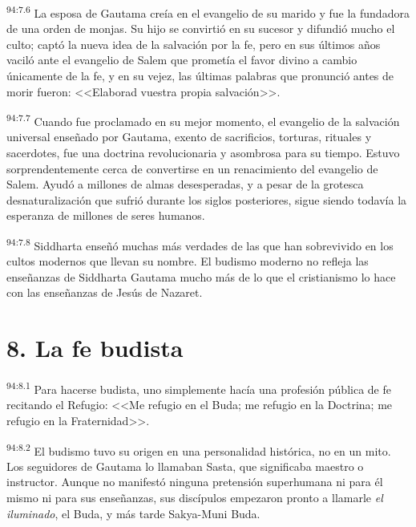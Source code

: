 \par
\textsuperscript{94:7.6} La esposa de Gautama creía en el evangelio de su marido y fue la fundadora de una orden de monjas. Su hijo se convirtió en su sucesor y difundió mucho el culto; captó la nueva idea de la salvación por la fe, pero en sus últimos años vaciló ante el evangelio de Salem que prometía el favor divino a cambio únicamente de la fe, y en su vejez, las últimas palabras que pronunció antes de morir fueron: <<Elaborad vuestra propia salvación>>.

\par
\textsuperscript{94:7.7} Cuando fue proclamado en su mejor momento, el evangelio de la salvación universal enseñado por Gautama, exento de sacrificios, torturas, rituales y sacerdotes, fue una doctrina revolucionaria y asombrosa para su tiempo. Estuvo sorprendentemente cerca de convertirse en un renacimiento del evangelio de Salem. Ayudó a millones de almas desesperadas, y a pesar de la grotesca desnaturalización que sufrió durante los siglos posteriores, sigue siendo todavía la esperanza de millones de seres humanos.

\par
\textsuperscript{94:7.8} Siddharta enseñó muchas más verdades de las que han sobrevivido en los cultos modernos que llevan su nombre. El budismo moderno no refleja las enseñanzas de Siddharta Gautama mucho más de lo que el cristianismo lo hace con las enseñanzas de Jesús de Nazaret.

\section*{8. La fe budista}
\par
\textsuperscript{94:8.1} Para hacerse budista, uno simplemente hacía una profesión pública de fe recitando el Refugio: <<Me refugio en el Buda; me refugio en la Doctrina; me refugio en la Fraternidad>>.

\par
\textsuperscript{94:8.2} El budismo tuvo su origen en una personalidad histórica, no en un mito. Los seguidores de Gautama lo llamaban Sasta, que significaba maestro o instructor. Aunque no manifestó ninguna pretensión superhumana ni para él mismo ni para sus enseñanzas, sus discípulos empezaron pronto a llamarle \textit{el iluminado}, el Buda, y más tarde Sakya-Muni Buda.

